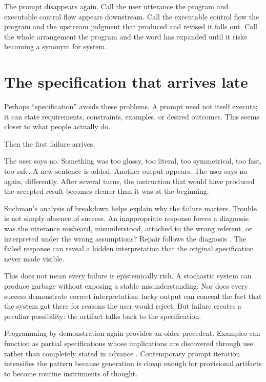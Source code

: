 \documentclass[11pt]{article}
\begin{document}
The prompt disappears again. Call the user utterance the program and executable control flow appears downstream. Call the executable control flow the program and the upstream judgment that produced and revised it falls out. Call the whole arrangement the program and the word has expanded until it risks becoming a synonym for system.

\section{The specification that arrives late}

Perhaps ``specification'' avoids these problems. A prompt need not itself execute; it can state requirements, constraints, examples, or desired outcomes. This seems closer to what people actually do.

Then the first failure arrives.

The user says no. Something was too glossy, too literal, too symmetrical, too fast, too safe. A new sentence is added. Another output appears. The user says no again, differently. After several turns, the instruction that would have produced the accepted result becomes clearer than it was at the beginning.

Suchman's analysis of breakdown helps explain why the failure matters. Trouble is not simply absence of success. An inappropriate response forces a diagnosis: was the utterance misheard, misunderstood, attached to the wrong referent, or interpreted under the wrong assumptions? Repair follows the diagnosis \parencite{suchman1985plans}. The failed response can reveal a hidden interpretation that the original specification never made visible.

This does not mean every failure is epistemically rich. A stochastic system can produce garbage without exposing a stable misunderstanding. Nor does every success demonstrate correct interpretation; lucky output can conceal the fact that the system got there for reasons the user would reject. But failure creates a peculiar possibility: the artifact talks back to the specification.

Programming by demonstration again provides an older precedent. Examples can function as partial specifications whose implications are discovered through use rather than completely stated in advance \parencite{smith1993pygmalion}. Contemporary prompt iteration intensifies the pattern because generation is cheap enough for provisional artifacts to become routine instruments of thought.
\end{document}
